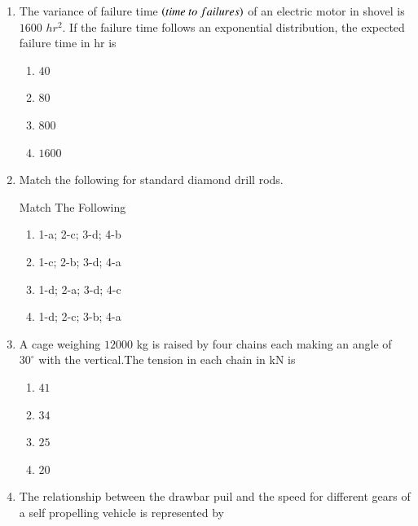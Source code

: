 \documentclass[journal,12pt,onecolumn]{IEEEtran}
\theoremstyle{remark}
\begin{document}
\begin{enumerate}
\hfill{}
\begin{multicols}{4}
\begin{enumerate}
\item $24.8$
\item $12.4$
\item $8.0$
\item $4.0$
\end{enumerate}
\end{multicols}
\item The variance of failure time $\left(time\ to\ failures\right)$ of an electric motor in shovel is $1600$ $hr^2$. If the failure time follows an exponential distribution, the expected failure time in hr is

\hfill{}
\begin{multicols}{4}
\begin{enumerate}
\item $40$
\item $80$
\item $800$
\item $1600$
\end{enumerate}
\end{multicols}
\item Match the following for standard diamond drill rods.
\begin{table}[H]
  \centering
  \caption{Match The Following}
  
  \label{tab:table3}
\end{table}
\vspace{0.5em}
\hfill{}


\vspace{0.5em}

\begin{multicols}{2}
\begin{enumerate}
\item  1-a; 2-c; 3-d; 4-b  
\item 1-c; 2-b; 3-d; 4-a  
\item  1-d; 2-a; 3-d; 4-c  
\item 1-d; 2-c; 3-b; 4-a
  
\end{enumerate}
\end{multicols}
\item A cage weighing $12000$ kg is raised by four chains each making an angle of $30^\circ$ with the vertical.The tension in each chain in kN is

\hfill{}
\begin{multicols}{4}
\begin{enumerate}
\item $41$
\item $34$
\item $25$
\item $20$
\end{enumerate}
\end{multicols}
\item The relationship between the drawbar puil and the speed for different gears of a self propelling vehicle is represented by


\end{enumerate}
\end{document}
